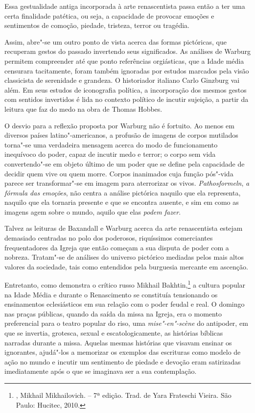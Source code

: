 Essa gestualidade antiga incorporada à arte renascentista passa então a
ter uma certa finalidade patética, ou seja, a capacidade de provocar
emoções e sentimentos de comoção, piedade, tristeza, terror ou tragédia.

Assim, abre"-se um outro ponto de vista acerca das formas pictóricas, que
recuperam gestos do passado invertendo seus significados. As análises de
Warburg permitem compreender até que ponto referências orgiásticas, que
a Idade média censurara tacitamente, foram também ignoradas por estudos
marcados pela visão classicista de serenidade e grandeza. O historiador
italiano Carlo Ginzburg vai além. Em seus estudos de iconografia
política, a incorporação dos mesmos gestos com sentidos invertidos é
lida no contexto político de incutir sujeição, a partir da leitura que
faz do medo na obra de Thomas Hobbes.

O desvio para a reflexão proposta por Warburg não é fortuito. Ao menos
em diversos países latino"-americanos, a profusão de imagens de corpos
mutilados torna"-se uma verdadeira mensagem acerca do modo de
funcionamento inequívoco do poder, capaz de incutir medo e terror; o
corpo sem vida convertendo"-se em objeto último de um poder que se define
pela capacidade de decidir quem vive ou quem morre. Corpos inanimados
cuja função pós"-vida parece ser transformar"-se em imagem para
aterrorizar os vivos. \emph{Pathosformeln}, \emph{a fórmula das
emoções}, não centra a análise pictórica naquilo que ela representa,
naquilo que ela tornaria presente e que se encontra ausente, e sim em
como as imagens agem sobre o mundo, aquilo que elas \emph{podem fazer}.

\asterisc

Talvez as leituras de Baxandall e Warburg acerca da arte renascentista
estejam demasiado centradas no polo dos poderosos, riquíssimos
comerciantes frequentadores da Igreja que então começam a sua disputa de
poder com a nobreza. Tratam"-se de análises do universo pictórico
mediadas pelos mais altos valores da sociedade, tais como entendidos pela burguesia mercante em ascenção.

Entretanto, como demonstra o crítico russo Mikhail Bakhtin,\footnote{, Mikhail Mikhailovich. {} -- 7ª edição. Trad. de Yara Frateschi Vieira. São Paulo: Hucitec, 2010.} a cultura
popular na Idade Média e durante o Renascimento se constituía
tensionando os ensinamentos eclesiásticos em sua relação com o poder feudal
e real. O domingo nas praças públicas, quando da saída da missa na
Igreja, era o momento preferencial para o teatro popular do riso, uma
\emph{mise"-en"-scène} do antipoder, em que se invertia, grotesca, sexual e
escatologicamente, as histórias bíblicas narradas
durante a missa. Aquelas mesmas histórias que visavam ensinar os ignorantes,
ajudá"-los a memorizar os exemplos das escrituras como modelo de ação no
mundo e incutir um sentimento de piedade e devoção eram satirizadas
imediatamente após o que se imaginava ser a sua contemplação.


